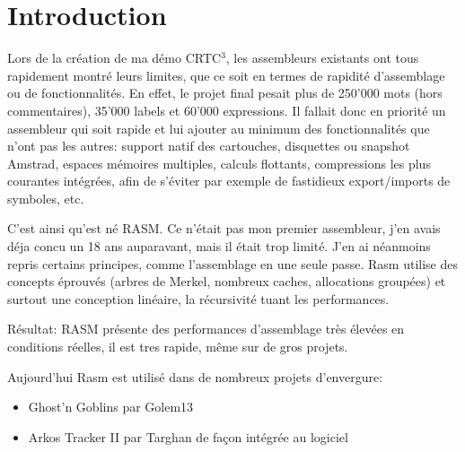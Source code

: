 \section{Introduction}

\begin{xfr}
Lors de la création de ma démo CRTC$^3$, les assembleurs existants ont tous rapidement montré leurs limites, que ce soit en termes de rapidité d'assemblage ou de fonctionnalités.
En effet, le projet final pesait plus de 250'000 mots (hors commentaires), 35'000 labels et 60'000 expressions.
Il fallait donc en priorité un assembleur qui soit rapide et lui ajouter au minimum des fonctionnalités que n'ont pas les autres: support natif des cartouches, disquettes ou snapshot Amstrad, espaces mémoires multiples, calculs flottants, compressions les plus courantes intégrées, afin de s'éviter par exemple de fastidieux export/imports de symboles, etc.

\medskip
C'est ainsi qu'est né RASM. Ce n'était pas mon premier assembleur, j'en avais déja concu un 18 ans auparavant, mais il était trop limité. J'en ai néanmoins repris certains principes, comme l'assemblage en une seule passe. Rasm utilise des concepts éprouvés (arbres de Merkel, nombreux caches, allocations groupées) et surtout une conception linéaire, la récursivité tuant les performances.

Résultat: RASM présente des performances d'assemblage très élevées en conditions réelles, il est tres rapide, même sur de gros projets. %

\medskip
Aujourd'hui Rasm est utilisé dans de nombreux projets d'envergure:
\begin{itemize}[noitemsep]
\item Ghost'n Goblins par Golem13
\item Arkos Tracker II par Targhan de façon intégrée au logiciel
\end{itemize}

\end{xfr}


